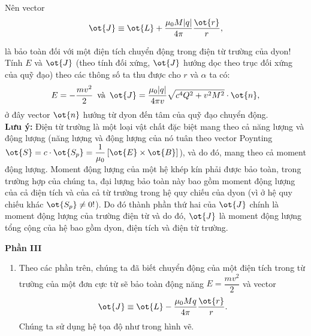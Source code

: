 \begin{loigiai}
\begin{enumerate}[1)]
\begin{enumerate}[1)]
Nên vector 
  \[ \ot{J} \equiv \ot{L} + \dfrac{\mu_0 M|q|}{4 \pi} \dfrac{\ot{r}}{r},\]

là bảo toàn đối với một điện tích chuyển động trong điện từ trường của dyon! Tính $E$ và $\ot{J}$ (theo tính đối xứng, $\ot{J}$ hướng dọc theo trục đối xứng của quỹ đạo) theo các thông số ta thu được cho $r$ và $\alpha$ ta có: 
  \[E = - \dfrac{mv^2}{2} \, \text{ và } \, \ot{J} = \dfrac{\mu_0 |q|}{4\pi v}\sqrt{c^4 Q^2 + v^2 M^2} \cdot \ot{n},\]
ở đây vector $\ot{n}$ hướng từ dyon đến tâm của quỹ đạo chuyển động.\\

\textbf{Lưu ý:} Điện từ trường là một loại vật chất đặc biệt mang theo cả năng lượng và động lượng (năng lượng và động lượng của nó tuân theo vector Poynting $\ot{S}= c\cdot \ot{S_p} = \dfrac{1}{\mu_0}\left[\ot{E} \times \ot{B}\right]$), và do đó, mang theo cả moment động lượng. Moment động lượng của một hệ khép kín phải được bảo toàn, trong trường hợp của chúng ta, đại lượng bảo toàn này bao gồm moment động lượng của cả điện tích và của cả từ trường trong hệ quy chiếu của dyon (vì ở hệ quy chiếu khác $\ot{S_p} \neq 0 !$). Do đó thành phần thứ hai của $\ot{J}$ chính là moment động lượng của trường điện từ và do đó, $\ot{J}$ là moment động lượng tổng cộng của hệ bao gồm dyon, điện tích và điện từ trường.
\end{enumerate}
\begin{center}
  \textbf{Phần III}
\end{center}
\begin{enumerate}[1)]
   \item Theo các phần trên, chúng ta đã biết chuyển động của một điện tích trong từ trường của một đơn cực từ sẽ bảo toàn động năng $E= \dfrac{mv^2}{2}$ và vector 
      $$\ot{J} \equiv \ot{L} - \dfrac{\mu_0 Mq}{4\pi} \dfrac{\ot{r}}{r}.$$
Chúng ta sử dụng hệ tọa độ như trong hình vẽ. 
\begin{center}



\begin{tikzpicture}[x=0.75pt,y=0.75pt,yscale=-1,xscale=1]


\end{tikzpicture}
\end{center}
\end{enumerate}
\end{enumerate}
\end{loigiai}
